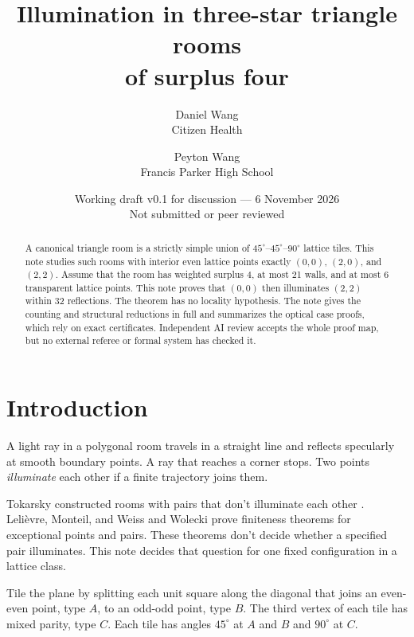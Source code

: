 \documentclass[11pt]{article}
\title{Illumination in three-star triangle rooms\\of surplus four}
\author{Daniel Wang\\\small Citizen Health \and Peyton Wang\\\small Francis Parker High School}
\date{Working draft v0.1 for discussion --- 6 November 2026\\\small Not submitted or peer reviewed}
\theoremstyle{remark}
\begin{document}
\maketitle
\vspace{-1.2em}
\begin{abstract}
A canonical triangle room is a strictly simple union of $45^\circ$--$45^\circ$--$90^\circ$ lattice tiles.
This note studies such rooms with interior even lattice points exactly $(0,0)$, $(2,0)$, and $(2,2)$.
Assume that the room has weighted surplus 4, at most 21 walls, and at most 6 transparent lattice points. This note proves that $(0,0)$ then illuminates $(2,2)$ within 32 reflections.
The theorem has no locality hypothesis.
The note gives the counting and structural reductions in full and summarizes the optical case proofs, which rely on exact certificates.
Independent AI review accepts the whole proof map, but no external referee or formal system has checked it.

\end{abstract}

\section{Introduction}
A light ray in a polygonal room travels in a straight line and reflects specularly at smooth boundary points. A ray that reaches a corner stops. Two points \emph{illuminate} each other if a finite trajectory joins them.

Tokarsky constructed rooms with pairs that don't illuminate each other \cite{Tokarsky1995}. Lelièvre, Monteil, and Weiss \cite[Theorem~2]{LMW2016} and Wolecki \cite[Theorem~1.2(i)]{Wolecki2024} prove finiteness theorems for exceptional points and pairs. These theorems don't decide whether a specified pair illuminates. This note decides that question for one fixed configuration in a lattice class.

Tile the plane by splitting each unit square along the diagonal that joins an even-even point, type $A$, to an odd-odd point, type $B$. The third vertex of each tile has mixed parity, type $C$. Each tile has angles $45^\circ$ at $A$ and $B$ and $90^\circ$ at $C$.
\end{document}
